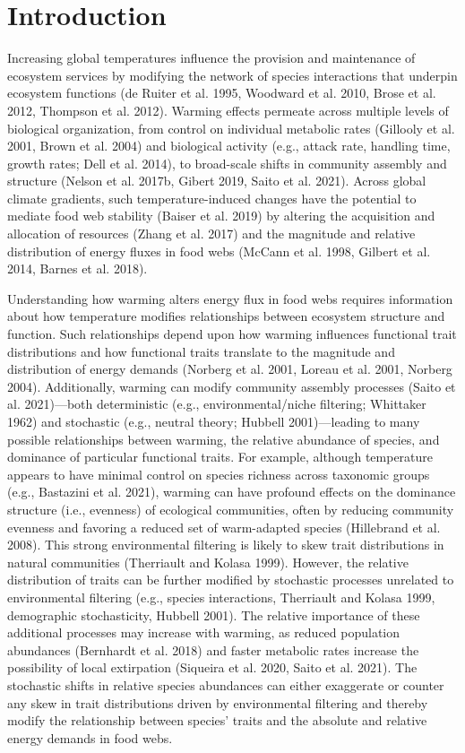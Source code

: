 \documentclass[
]{article}
\numberwithin{equation}
\begin{document}
\hypertarget{introduction}{%
\section{Introduction}\label{introduction}}

Increasing global temperatures influence the provision and maintenance
of ecosystem services by modifying the network of species interactions
that underpin ecosystem functions (de Ruiter et al. 1995, Woodward et
al. 2010, Brose et al. 2012, Thompson et al. 2012). Warming effects
permeate across multiple levels of biological organization, from control
on individual metabolic rates (Gillooly et al. 2001, Brown et al. 2004)
and biological activity (e.g., attack rate, handling time, growth rates;
Dell et al. 2014), to broad-scale shifts in community assembly and
structure (Nelson et al. 2017b, Gibert 2019, Saito et al. 2021). Across
global climate gradients, such temperature-induced changes have the
potential to mediate food web stability (Baiser et al. 2019) by altering
the acquisition and allocation of resources (Zhang et al. 2017) and the
magnitude and relative distribution of energy fluxes in food webs
(McCann et al. 1998, Gilbert et al. 2014, Barnes et al. 2018).

Understanding how warming alters energy flux in food webs requires
information about how temperature modifies relationships between
ecosystem structure and function. Such relationships depend upon how
warming influences functional trait distributions and how functional
traits translate to the magnitude and distribution of energy demands
(Norberg et al. 2001, Loreau et al. 2001, Norberg 2004). Additionally,
warming can modify community assembly processes (Saito et al.
2021)---both deterministic (e.g., environmental/niche filtering;
Whittaker 1962) and stochastic (e.g., neutral theory; Hubbell
2001)---leading to many possible relationships between warming, the
relative abundance of species, and dominance of particular functional
traits. For example, although temperature appears to have minimal
control on species richness across taxonomic groups (e.g., Bastazini et
al. 2021), warming can have profound effects on the dominance structure
(i.e., evenness) of ecological communities, often by reducing community
evenness and favoring a reduced set of warm-adapted species (Hillebrand
et al. 2008). This strong environmental filtering is likely to skew
trait distributions in natural communities (Therriault and Kolasa 1999).
However, the relative distribution of traits can be further modified by
stochastic processes unrelated to environmental filtering (e.g., species
interactions, Therriault and Kolasa 1999, demographic stochasticity,
Hubbell 2001). The relative importance of these additional processes may
increase with warming, as reduced population abundances (Bernhardt et
al. 2018) and faster metabolic rates increase the possibility of local
extirpation (Siqueira et al. 2020, Saito et al. 2021). The stochastic
shifts in relative species abundances can either exaggerate or counter
any skew in trait distributions driven by environmental filtering and
thereby modify the relationship between species' traits and the absolute
and relative energy demands in food webs.
\end{document}
